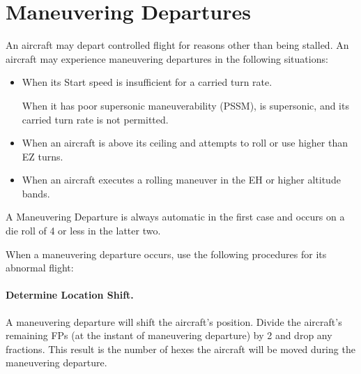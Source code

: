 \begin{advancedrules}
\begin{itemize}

\end{itemize}


\section{Maneuvering Departures}
\label{rule:maneuvering-departures}

An aircraft may depart controlled flight for reasons other than being stalled. An aircraft may experience maneuvering departures in the following situations:

\begin{itemize}

    \item When its Start speed is insufficient for a carried turn rate.

    
     When it has poor supersonic maneuverability (PSSM), is supersonic, and its carried turn rate is not permitted.  


    \item When an aircraft is above its ceiling and attempts to roll or use higher than EZ turns.

    \item When an aircraft executes a rolling maneuver in the EH or higher altitude bands.

\end{itemize}

A Maneuvering Departure is always automatic in the first case and occurs on a die roll of 4 or less in the latter two.  

When a maneuvering departure occurs, use the following procedures for its abnormal flight:

\paragraph{Determine Location Shift.} A maneuvering departure will shift the aircraft's position. Divide the aircraft's remaining FPs (at the instant of maneuvering departure) by 2 and drop any fractions. This result is the number of hexes the aircraft will be moved during the maneuvering departure.


\end{advancedrules}

